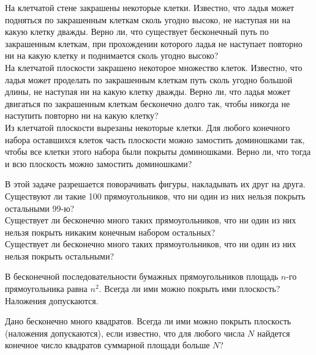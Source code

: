 \documentclass[a4paper,12pt]{article}
\begin{document}
 На клетчатой стене закрашены некоторые клетки. Известно, что ладья может подняться по закрашенным клеткам сколь угодно высоко, не наступая ни на какую клетку дважды. Верно ли, что существует бесконечный путь по закрашенным клеткам, при прохождении которого ладья не наступает повторно ни на какую клетку и поднимается сколь угодно высоко?\\
 На клетчатой плоскости закрашено некоторое множество клеток. Известно, что ладья может проделать по закрашенным клеткам путь сколь угодно большой длины, не наступая ни на какую клетку дважды. Верно ли, что ладья может двигаться по закрашенным клеткам бесконечно долго так, чтобы никогда не наступить повторно ни на какую клетку?\\
 Из клетчатой плоскости вырезаны некоторые клетки. Для любого конечного набора оставшихся клеток часть плоскости можно замостить доминошками так, чтобы все клетки этого набора были покрыты доминошками. Верно ли, что тогда и всю плоскость можно замостить доминошками?





 В этой задаче разрешается поворачивать фигуры, накладывать их друг на друга.\\
 Существуют ли такие 100 прямоугольников, что ни один из них нельзя покрыть остальными 99-ю?\\
 Существует ли бесконечно много таких прямоугольников, что ни один из них нельзя покрыть никаким конечным набором остальных?\\
 Существует ли бесконечно много таких прямоугольников, что ни один из них нельзя покрыть остальными?

В бесконечной последовательности бумажных прямоугольников площадь $n$-го прямоугольника равна $n^2$. Всегда ли ими можно покрыть ими плоскость? Наложения допускаются.

Дано бесконечно много квадратов. Всегда ли ими можно покрыть плоскость (наложения допускаются), если известно, что для любого числа $N$ найдется конечное число квадратов суммарной площади больше $N$?




\end{document}
